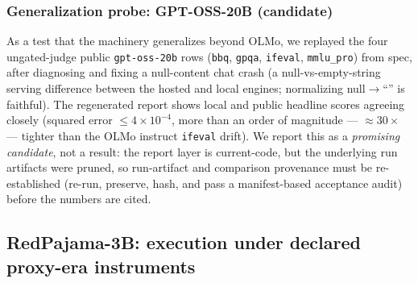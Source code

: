 \subsubsection{Generalization probe: GPT-OSS-20B (candidate)}
\label{sec:gptoss}
As a test that the machinery generalizes beyond OLMo, we replayed the four
ungated-judge public \texttt{gpt-oss-20b} rows (\texttt{bbq}, \texttt{gpqa},
\texttt{ifeval}, \texttt{mmlu\_pro}) from spec, after diagnosing and fixing a
null-content chat crash (a null-vs-empty-string serving difference between the
hosted and local engines; normalizing null$\to$``'' is faithful). The regenerated
report shows local and public headline scores agreeing closely (squared error
${\le}4{\times}10^{-4}$, more than an order of magnitude --- ${\approx}30\times$
--- tighter than the OLMo instruct \texttt{ifeval} drift). We report this as a
\emph{promising candidate}, not a result: the report layer is current-code, but
the underlying run artifacts were pruned, so run-artifact and comparison
provenance must be re-established (re-run, preserve, hash, and pass a
manifest-based acceptance audit) before the numbers are cited.
\par\smallskip\noindent{}\par\smallskip

\subsection{RedPajama-3B: execution under declared proxy-era instruments}
\label{sec:redpajama}

